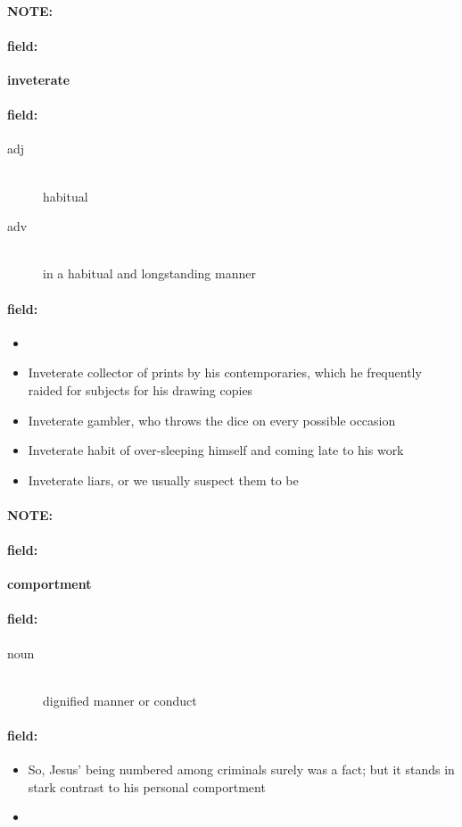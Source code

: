 \documentclass[12pt]{article}
\newenvironment{note}{\paragraph{NOTE:}}{}
\newenvironment{field}{\paragraph{field:}}{}
\begin{document}
\begin{note}
\begin{field}
\textbf{\large inveterate}
\end{field}


\begin{field}
\begin{description}
\item[adj] \hfill \\ 
habitual

\item[adv] \hfill \\ 
in a habitual and longstanding manner

\end{description}
\end{field}

\begin{field}
\begin{itemize}
\item 
\item Inveterate collector of prints by his contemporaries, which he frequently raided for subjects for his drawing copies
\item Inveterate gambler, who throws the dice on every possible occasion
\item Inveterate habit of over-sleeping himself and coming late to his work
\item Inveterate liars, or we usually suspect them to be
\end{itemize}
\end{field}
\end{note}
\begin{note}
\begin{field}
\textbf{\large comportment}
\end{field}


\begin{field}
\begin{description}
\item[noun] \hfill \\ 
dignified manner or conduct

\end{description}
\end{field}

\begin{field}
\begin{itemize}
\item So, Jesus' being numbered among criminals surely was a fact; but it stands in stark contrast to his personal comportment
\item 
\end{itemize}
\end{field}
\end{note}
\end{document}
